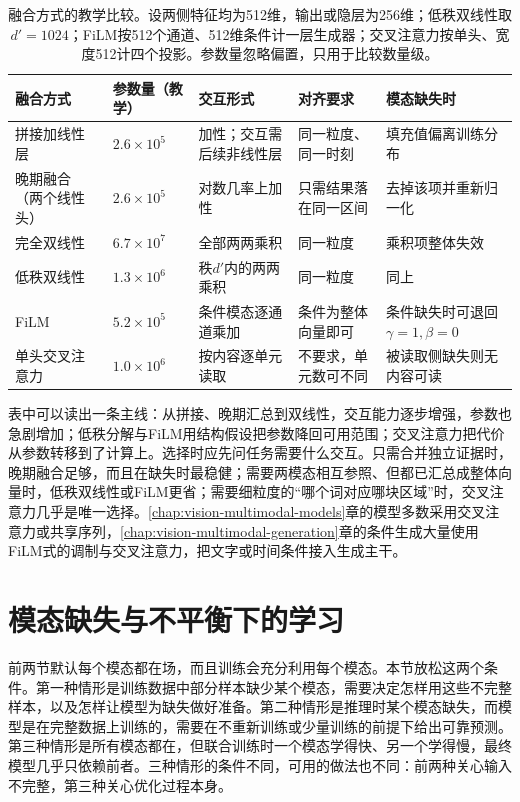 \begin{table}[tbp]
  \centering
  \small
  \begin{tabularx}{\linewidth}{@{}p{24mm}p{20mm}XXX@{}}
    \toprule
    融合方式 & 参数量（教学） & 交互形式 & 对齐要求 & 模态缺失时\\
    \midrule
    拼接加线性层 & $2.6\times10^5$ & 加性；交互需后续非线性层 & 同一粒度、同一时刻 & 填充值偏离训练分布\\
    晚期融合（两个线性头） & $2.6\times10^5$ & 对数几率上加性 & 只需结果落在同一区间 & 去掉该项并重新归一化\\
    完全双线性 & $6.7\times10^7$ & 全部两两乘积 & 同一粒度 & 乘积项整体失效\\
    低秩双线性 & $1.3\times10^6$ & 秩$d'$内的两两乘积 & 同一粒度 & 同上\\
    FiLM & $5.2\times10^5$ & 条件模态逐通道乘加 & 条件为整体向量即可 & 条件缺失时可退回$\gamma=1,\beta=0$\\
    单头交叉注意力 & $1.0\times10^6$ & 按内容逐单元读取 & 不要求，单元数可不同 & 被读取侧缺失则无内容可读\\
    \bottomrule
  \end{tabularx}
  \caption{融合方式的教学比较。设两侧特征均为512维，输出或隐层为256维；低秩双线性取$d'=1024$；FiLM按512个通道、512维条件计一层生成器；交叉注意力按单头、宽度512计四个投影。参数量忽略偏置，只用于比较数量级。}
  \label{tab:vision-alignment-fusion-compare}
\end{table}

表中可以读出一条主线：从拼接、晚期汇总到双线性，交互能力逐步增强，参数也急剧增加；低秩分解与FiLM用结构假设把参数降回可用范围；交叉注意力把代价从参数转移到了计算上。选择时应先问任务需要什么交互。只需合并独立证据时，晚期融合足够，而且在缺失时最稳健；需要两模态相互参照、但都已汇总成整体向量时，低秩双线性或FiLM更省；需要细粒度的“哪个词对应哪块区域”时，交叉注意力几乎是唯一选择。\ref{chap:vision-multimodal-models}章的模型多数采用交叉注意力或共享序列，\ref{chap:vision-multimodal-generation}章的条件生成大量使用FiLM式的调制与交叉注意力，把文字或时间条件接入生成主干。

\section{模态缺失与不平衡下的学习}
\label{sec:vision-alignment-missing}

前两节默认每个模态都在场，而且训练会充分利用每个模态。本节放松这两个条件。第一种情形是训练数据中部分样本缺少某个模态，需要决定怎样用这些不完整样本，以及怎样让模型为缺失做好准备。第二种情形是推理时某个模态缺失，而模型是在完整数据上训练的，需要在不重新训练或少量训练的前提下给出可靠预测。第三种情形是所有模态都在，但联合训练时一个模态学得快、另一个学得慢，最终模型几乎只依赖前者。三种情形的条件不同，可用的做法也不同：前两种关心输入不完整，第三种关心优化过程本身。

